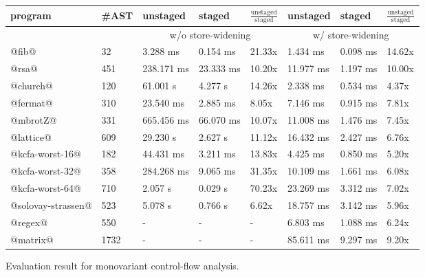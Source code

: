 \begin{figure}[h]
\footnotesize
\begin{tabular}{@{}ll|lll|lll@{}}
\toprule
    program             &\#AST & unstaged   & staged     & $\frac{\text{unstaged}}{\text{staged}}$ & unstaged   & staged    & $\frac{\text{unstaged}}{\text{staged}}$  \\ 
    \midrule
                        &      & \multicolumn{3}{c}{w/o store-widening}  &  \multicolumn{3}{c}{w/ store-widening}\\
    \midrule
    @fib@               & 32   & 3.288 ms   & 0.154 ms   & 21.33x      & 1.434 ms   & 0.098 ms  &  14.62x       \\
    @rsa@               & 451  & 238.171 ms & 23.333 ms  & 10.20x      & 11.977 ms  & 1.197 ms  &  10.00x       \\
    @church@            & 120  & 61.001 s   & 4.277 s    & 14.26x      & 2.338 ms   & 0.534 ms  &  4.37x        \\
    @fermat@            & 310  & 23.540 ms  & 2.885 ms   & 8.05x       & 7.146 ms   & 0.915 ms  &  7.81x        \\
    @mbrotZ@            & 331  & 665.456 ms & 66.070 ms  & 10.07x      & 11.008 ms  & 1.476 ms  &  7.45x        \\
    @lattice@           & 609  & 29.230 s   & 2.627 s    & 11.12x      & 16.432 ms  & 2.427 ms  &  6.76x        \\
    @kcfa-worst-16@     & 182  & 44.431 ms  & 3.211 ms   & 13.83x      & 4.425 ms   & 0.850 ms  &  5.20x        \\
    @kcfa-worst-32@     & 358  & 284.268 ms & 9.065 ms   & 31.35x      & 10.109 ms  & 1.661 ms  &  6.08x        \\
    @kcfa-worst-64@     & 710  & 2.057 s    & 0.029 s    & 70.23x      & 23.269 ms  & 3.312 ms  &  7.02x        \\
    @solovay-strassen@  & 523  & 5.078 s    & 0.766 s    & 6.62x       & 18.757 ms  & 3.142 ms  &  5.96x       \\
    @regex@             & 550  & -          & -          & -           & 6.803 ms   & 1.088 ms  &  6.24x       \\
    @matrix@            & 1732 & -          & -          & -           & 85.611 ms  & 9.297 ms  &  9.20x       \\
    \bottomrule
\end{tabular}
\caption{Evaluation result for monovariant control-flow analysis.} \label{evaluation_result}
\end{figure}


